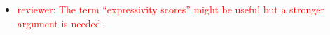 \documentclass{acm_proc_article-sp}
\begin{document}
\begin{itemize}
	\item \textcolor{red}{reviewer: The term “expressivity scores” might be useful but a stronger argument is needed.}
\end{itemize}





\end{document}

